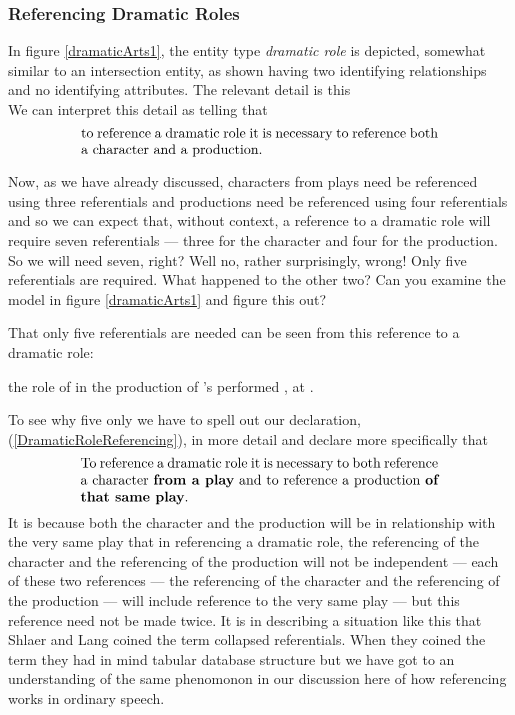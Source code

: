  \subsubsection{Referencing Dramatic Roles}
\mynote
In figure \ref{dramaticArts1}, the entity type \textit{dramatic role} is
depicted, somewhat similar to an intersection entity, as shown having
two identifying relationships and no identifying attributes.
The relevant detail is  this
\begin{equation*}

\end{equation*}
We can interpret this detail as telling that
\begin{equation}
\label{DramaticRoleReferencing}
\text{\parbox{9cm}{to reference a dramatic role it is necessary  
to reference both a character and  a production.}}
\end{equation}

Now, as we have already discussed, characters from plays need be referenced using three referentials
and productions need be referenced using four referentials 
and so we can expect that, without context, a reference to
a dramatic role will require seven referentials
 --- three for the character and four for the production. 
So we will need seven, right?
 Well no, rather surprisingly, wrong! Only five referentials are required. 
 What happened to the other two? Can you examine the model in figure \ref{dramaticArts1} and figure this out?

That only five referentials are needed can be seen from this reference to a dramatic role:
\begin{erquote}
\parbox{9.0cm}{the role of  in the production of \mbox{'s}  performed \mbox{,} at .
}
\end{erquote}

To see why five only we have to spell out our declaration, (\ref{DramaticRoleReferencing}), in more detail
and declare more specifically that
\begin{equation}
\label{DramaticRoleReferencingRevised}
\text{\parbox{9cm}{To reference a dramatic role it is necessary 
to both reference a character \textbf{from a play} and to reference a production \textbf{of that same play}.}}
\end{equation}
It is because both the character and the production will be in relationship with the very same play
that in referencing a dramatic role, the referencing of the character and the referencing of
the production will not be independent
--- each of these two references --- the referencing of the character and the referencing of the production ---
 will include reference to the very same play --- but this reference need not be made twice. 
It is in describing a situation like this that Shlaer and Lang coined the term collapsed referentials. 
 When they coined the term they had in mind tabular database structure 
 but we have got to an understanding of the same phenomonon in our discussion here 
 of how referencing works in ordinary speech. 

